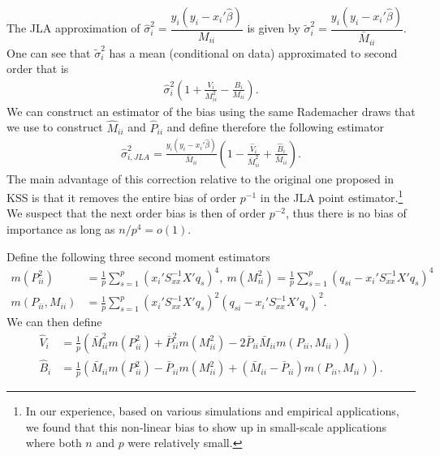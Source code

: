 \documentclass[letterpaper,12pt]{article}
\theoremstyle{remark}
\theoremstyle{definition}
\theoremstyle{plain}
\newcommand\inverse{^{-1}}
\begin{document}
The JLA approximation of $\hat{\sigma}^{2}_{i}=\dfrac{y_{i}(y_{i}-x_{i}'\hat{\beta})}{M_{ii}}$ is given by $\tilde{\sigma}^{2}_{i}=\dfrac{y_{i}(y_{i}-x_{i}'\hat{\beta})}{\bar{M}_{ii}}$. One can see that $\tilde{\sigma}^{2}_{i}$ has a mean (conditional on data) approximated to second order that is 
\begin{align}
	\hat \sigma_{i}^2 \left(1 + \frac{V_i}{M_{ii}^2} - \frac{B_i}{M_{ii}}\right).
\end{align}
We can construct an estimator of the bias using the same Rademacher draws that we use to construct $\hat M_{ii}$ and $\hat P_{ii}$ and define therefore the following estimator
\begin{align}
	\hat \sigma_{i,JLA}^2 = \frac{y_i (y_{i}-x_{i}'\hat{\beta})}{\bar M_{ii}}\left(1- \frac{\hat V_i}{\bar M_{ii}^2} + \frac{\hat B_i}{\bar M_{ii}}\right).
\end{align}
The main advantage of this correction relative to the original one proposed in KSS is that it removes the entire bias of order $p\inverse$ in the JLA point estimator.\footnote{In our experience, based on various simulations and empirical applications, we found that this non-linear bias to show up in small-scale applications where both $n$ and $p$ were relatively small.} We suspect that the next order bias is then of order $p^{-2}$, thus there is no bias of importance as long as $n/p^4 = o(1)$. 

Define the following three second moment estimators
\begin{align}
m(P_{ii}^2)  &= \frac{1}{p} \sum_{s=1}^p (x_i'S_{xx}\inverse X'q_s)^4, \
m(M_{ii}^2)  = \frac{1}{p} \sum_{s=1}^p (q_{si} - x_i'S_{xx}\inverse X'q_s)^4 \\
m(P_{ii},M_{ii})  &= \frac{1}{p} \sum_{s=1}^p (x_i'S_{xx}\inverse X'q_s)^2(q_{si} - x_i'S_{xx}\inverse X'q_s)^2.
\end{align}
We can then define
\begin{align}
\hat V_i &= \frac{1}{p}\left(\bar M_{ii}^2 m(P_{ii}^2) + \bar P_{ii}^2 m(M_{ii}^2) - 2\bar P_{ii}\bar M_{ii} m(P_{ii},M_{ii})  \right) \\
\hat B_i &= \frac{1}{p} \left(  \bar M_{ii} m(P_{ii}^2)  - \bar P_{ii} m(M_{ii}^2) + (\bar M_{ii}-\bar P_{ii}) m(P_{ii},M_{ii})   \right).
\end{align}



\end{document}
